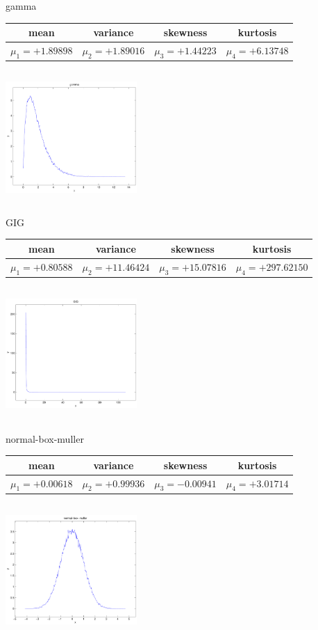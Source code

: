 \documentclass[9pt]{article}
\theoremstyle{plain}
\theoremstyle{definition}
\theoremstyle{remark}
\numberwithin{equation}{section}
\begin{document}
\newpage
gamma \begin{tabular}{|c|c|c|c|}  mean & variance & skewness & kurtosis \\  \hline
$\mu_1 = +1.89898$ & $\mu_2 = +1.89016$ & $\mu_3 = +1.44223$ & $\mu_4 =+6.13748$ \\
\end{tabular}

\includegraphics[width=5cm,height=5cm]{gamma.pdf}

GIG \begin{tabular}{|c|c|c|c|}  mean & variance & skewness & kurtosis \\  \hline
$\mu_1 = +0.80588$ & $\mu_2 = +11.46424$ & $\mu_3 = +15.07816$ & $\mu_4 =+297.62150$ \\
\end{tabular}

\includegraphics[width=5cm,height=5cm]{GIG.pdf}

normal-box-muller \begin{tabular}{|c|c|c|c|}  mean & variance & skewness & kurtosis \\  \hline
$\mu_1 = +0.00618$ & $\mu_2 = +0.99936$ & $\mu_3 = -0.00941$ & $\mu_4 =+3.01714$ \\
\end{tabular}

\includegraphics[width=5cm,height=5cm]{normal-box-muller.pdf}
\end{document}
